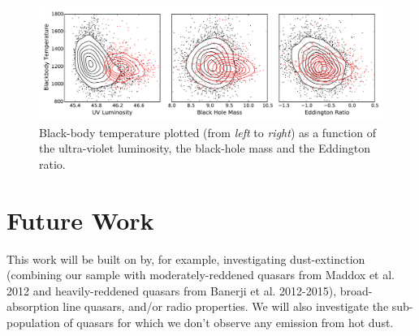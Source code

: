 \begin{figure}
    \centering
    \includegraphics[width=\columnwidth]{figures/chapter05/bbt_correlations.pdf}
    \caption{Black-body temperature plotted (from {\it left} to {\it right}) as a function of the ultra-violet luminosity, the black-hole mass and the Eddington ratio.}  
    \label{fig:figure1}
\end{figure}


\section{Future Work}

This work will be built on by, for example, investigating dust-extinction (combining our sample with moderately-reddened quasars from Maddox et al. 2012 and heavily-reddened quasars from Banerji et al. 2012-2015), broad-absorption line quasars, and/or radio properties. We will also investigate the sub-population of quasars for which we don't observe any emission from hot dust. 

